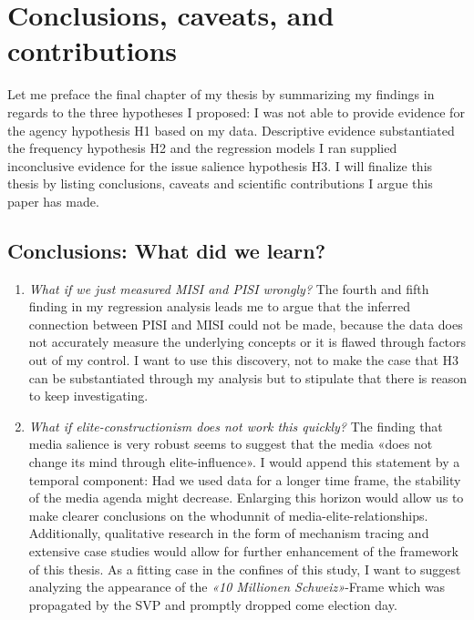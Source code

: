\documentclass[11pt,a4paper]{article}
\begin{document}
\section{Conclusions, caveats, and contributions}
Let me preface the final chapter of my thesis by summarizing my findings in regards to the three hypotheses I proposed: I was not able to provide evidence for the agency hypothesis H1 based on my data. Descriptive evidence substantiated the frequency hypothesis H2 and the regression models I ran supplied inconclusive evidence for the issue salience hypothesis H3. I will finalize this thesis by listing conclusions, caveats and scientific contributions I argue this paper has made.


\subsection{Conclusions: What did we learn?}
\begin{enumerate}
    \item \textit{What if we just measured MISI and PISI wrongly?} The fourth and fifth finding in my regression analysis leads me to argue that the inferred connection between PISI and MISI could not be made, because the data does not accurately measure the underlying concepts or it is flawed through factors out of my control. I want to use this discovery, not to make the case that H3 can be substantiated through my analysis but to stipulate that there is reason to keep investigating.
    \item \textit{What if elite-constructionism does not work this quickly?} The finding that media salience is very robust seems to suggest that the media «does not change its mind through elite-influence». I would append this statement by a temporal component: Had we used data for a longer time frame, the stability of the media agenda might decrease. Enlarging this horizon would allow us to make clearer conclusions on the whodunnit of media-elite-relationships. Additionally, qualitative research in the form of mechanism tracing and extensive case studies would allow for further enhancement of the framework of this thesis. As a fitting case in the confines of this study, I want to suggest analyzing the appearance of the \textit{«10 Millionen Schweiz»}-Frame which was propagated by the SVP and promptly dropped come election day. 
\end{enumerate}
\end{document}

